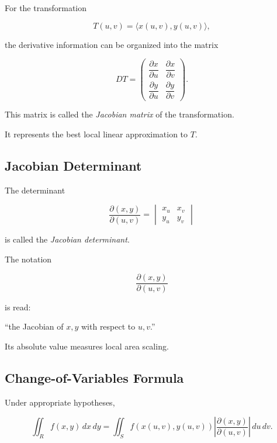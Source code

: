For the transformation

\[ T(u,v)=\langle x(u,v),y(u,v)\rangle, \]

the derivative information can be organized into the matrix

\[ DT=
\begin{pmatrix}
\dfrac{\partial x}{\partial u} &
\dfrac{\partial x}{\partial v}\\[2mm]
\dfrac{\partial y}{\partial u} &
\dfrac{\partial y}{\partial v}
\end{pmatrix}. \]

This matrix is called the \emph{Jacobian matrix} of the transformation.

It represents the best local linear approximation to \(T\).

\subsection{Jacobian Determinant}
\label{subsec:jacobian-determinant}

The determinant

\[ \frac{\partial(x,y)}{\partial(u,v)}
=
\begin{vmatrix}
x_u & x_v\\
y_u & y_v
\end{vmatrix} \]

is called the \emph{Jacobian determinant}.

The notation

\[ \frac{\partial(x,y)}{\partial(u,v)} \]

is read:

``the Jacobian of \(x,y\) with respect to \(u,v\).''

Its absolute value measures local area scaling.

\subsection{Change-of-Variables Formula}
\label{subsec:change-variables-formula}

Under appropriate hypotheses,

\[ \boxed{
\iint_R f(x,y)\,dx\,dy
=
\iint_S
f(x(u,v),y(u,v))
\left|
\frac{\partial(x,y)}{\partial(u,v)}
\right|
\,du\,dv.
} \]

